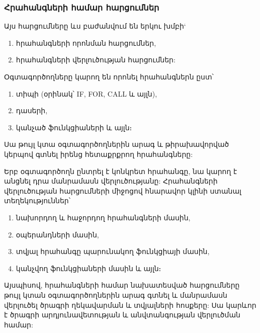 \subsubsection*{Հրահանգների համար հարցումներ}\label{subsubsec:instructions}

Այս հարցումները ևս բաժանվում են երկու խմբի`
\begin{enumerate}
    \item հրահանգների որոնման հարցումներ,
    \item հրահանգների վերլուծության հարցումներ:
\end{enumerate}
Օգտագործողները կարող են որոնել հրահանգներն ըստ՝
\begin{enumerate}
    \item տիպի (օրինակ՝ IF, FOR, CALL և այլն),
    \item դասերի,
    \item կանչած ֆունկցիաների և այլն։
\end{enumerate}

Սա թույլ կտա օգտագործողներին արագ և թիրախավորված կերպով գտնել իրենց հետաքրքրող հրահանգները:

Երբ օգտագործողն ընտրել է կոնկրետ հրահանգը, նա կարող է անցնել դրա մանրամասն վերլուծությանը:  Հրահանգների վերլուծության հարցումների
միջոցով հնարավոր կլինի ստանալ տեղեկություններ՝
\begin{enumerate}
    \item նախորդող և հաջորդող հրահանգների մասին,
    \item օպերանդների մասին,
    \item տվյալ հրահանգը պարունակող ֆունկցիայի մասին,
    \item կանչվող ֆունկցիաների մասին և այլն։
\end{enumerate}

Այսպիսով, հրահանգների համար նախատեսված հարցումները թույլ կտան օգտագործողներին արագ գտնել և մանրամասն վերլուծել
ծրագրի ղեկավարման և տվյալների հոսքերը: Սա կարևոր է ծրագրի արդյունավետության և անվտանգության վերլուծման համար: